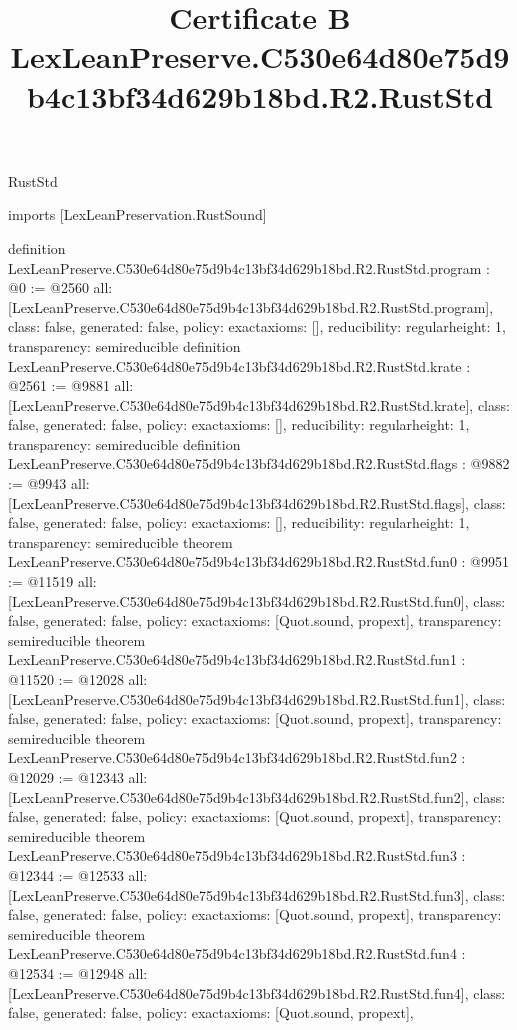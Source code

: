 \begin{lexlean}{RustStd}
\title{Certificate B LexLeanPreserve.C530e64d80e75d9b4c13bf34d629b18bd.R2.RustStd}
\begin{coremodule}
imports [LexLeanPreservation.RustSound]

definition LexLeanPreserve.C530e64d80e75d9b4c13bf34d629b18bd.R2.RustStd.program : @0 := @2560 {
  all: [LexLeanPreserve.C530e64d80e75d9b4c13bf34d629b18bd.R2.RustStd.program],
  class: false,
  generated: false,
  policy: exact{axioms: []},
  reducibility: regular{height: 1},
  transparency: semireducible
}
definition LexLeanPreserve.C530e64d80e75d9b4c13bf34d629b18bd.R2.RustStd.krate : @2561 := @9881 {
  all: [LexLeanPreserve.C530e64d80e75d9b4c13bf34d629b18bd.R2.RustStd.krate],
  class: false,
  generated: false,
  policy: exact{axioms: []},
  reducibility: regular{height: 1},
  transparency: semireducible
}
definition LexLeanPreserve.C530e64d80e75d9b4c13bf34d629b18bd.R2.RustStd.flags : @9882 := @9943 {
  all: [LexLeanPreserve.C530e64d80e75d9b4c13bf34d629b18bd.R2.RustStd.flags],
  class: false,
  generated: false,
  policy: exact{axioms: []},
  reducibility: regular{height: 1},
  transparency: semireducible
}
theorem LexLeanPreserve.C530e64d80e75d9b4c13bf34d629b18bd.R2.RustStd.fun0 : @9951 := @11519 {
  all: [LexLeanPreserve.C530e64d80e75d9b4c13bf34d629b18bd.R2.RustStd.fun0],
  class: false,
  generated: false,
  policy: exact{axioms: [Quot.sound, propext]},
  transparency: semireducible
}
theorem LexLeanPreserve.C530e64d80e75d9b4c13bf34d629b18bd.R2.RustStd.fun1 : @11520 := @12028 {
  all: [LexLeanPreserve.C530e64d80e75d9b4c13bf34d629b18bd.R2.RustStd.fun1],
  class: false,
  generated: false,
  policy: exact{axioms: [Quot.sound, propext]},
  transparency: semireducible
}
theorem LexLeanPreserve.C530e64d80e75d9b4c13bf34d629b18bd.R2.RustStd.fun2 : @12029 := @12343 {
  all: [LexLeanPreserve.C530e64d80e75d9b4c13bf34d629b18bd.R2.RustStd.fun2],
  class: false,
  generated: false,
  policy: exact{axioms: [Quot.sound, propext]},
  transparency: semireducible
}
theorem LexLeanPreserve.C530e64d80e75d9b4c13bf34d629b18bd.R2.RustStd.fun3 : @12344 := @12533 {
  all: [LexLeanPreserve.C530e64d80e75d9b4c13bf34d629b18bd.R2.RustStd.fun3],
  class: false,
  generated: false,
  policy: exact{axioms: [Quot.sound, propext]},
  transparency: semireducible
}
theorem LexLeanPreserve.C530e64d80e75d9b4c13bf34d629b18bd.R2.RustStd.fun4 : @12534 := @12948 {
  all: [LexLeanPreserve.C530e64d80e75d9b4c13bf34d629b18bd.R2.RustStd.fun4],
  class: false,
  generated: false,
  policy: exact{axioms: [Quot.sound, propext]},
}
\end{coremodule}
\end{lexlean}
